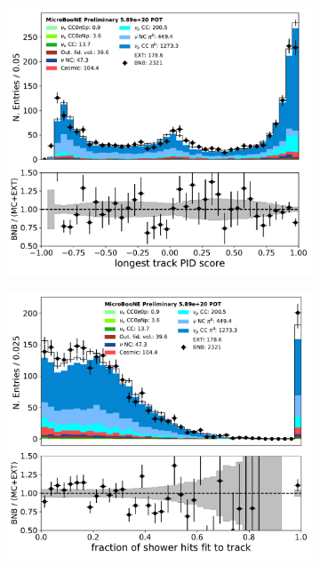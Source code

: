 \begin{figure}[H] 
\begin{center}
    \begin{subfigure}[b]{0.3\textwidth}
    \centering
    \includegraphics[width=1.00\textwidth]{pi0/nueselection/trkpid_03112020_ALL_scaled.pdf}
    \caption{}
    \end{subfigure}
    \begin{subfigure}[b]{0.3\textwidth}
    \centering
    \includegraphics[width=1.00\textwidth]{pi0/nueselection/trkfit_03112020_ALL_scaled.pdf}

\end{subfigure}
\end{center}
\end{figure}
